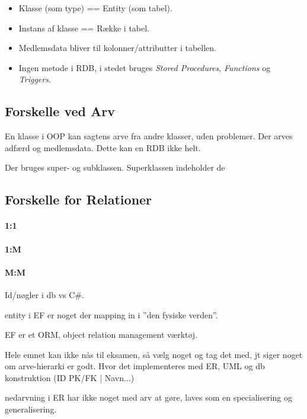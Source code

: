 \begin{itemize}
	\item Klasse (som type) == Entity (som tabel). 
	\item Instans af klasse == Række i tabel.
	\item Medlemsdata bliver til kolonner/attributter i tabellen.
	\item Ingen metode i RDB, i stedet bruges \textit{Stored Procedures}, \textit{Functions} og \textit{Triggers}.
\end{itemize}

\subsection{Forskelle ved Arv}\label{sec:arv}
En klasse i OOP kan sagtens arve fra andre klasser, uden problemer. Der arves adfærd og medlemsdata. Dette kan en RDB ikke helt.

Der bruges super- og subklassen. Superklassen indeholder de 

\subsection{Forskelle for Relationer}

\paragraph{1:1}
\paragraph{1:M}
\paragraph{M:M}

Id/nøgler i db vs C\#. 


entity i EF er noget der mapping in i ''den fysiske verden''.

EF er et ORM, object relation management værktøj.

Hele emnet kan ikke nås til eksamen, så vælg noget og tag det med, jt siger noget om arve-hierarki er godt. Hvor det implementeres med ER, UML og db konstruktion (ID PK/FK | Navn...)

nedarvning i ER har ikke noget med arv at gøre, laves som en specialisering og generalisering.
